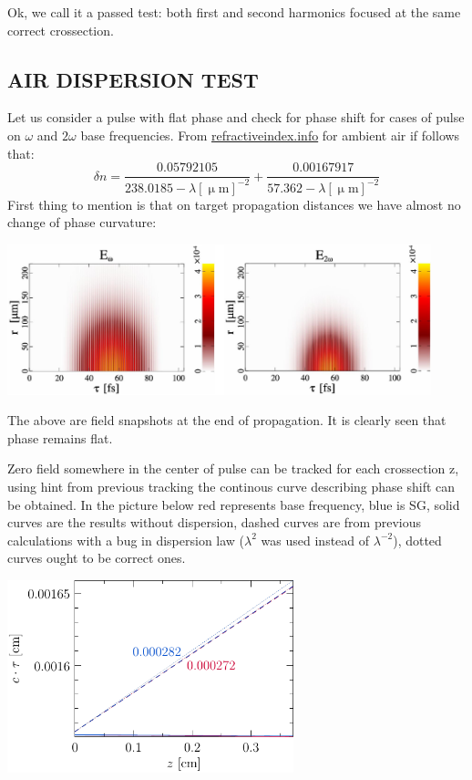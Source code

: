 \documentclass{article}
\newcommand{\ff}{\frac}
\newcommand{\mum}{\upmu\mathrm{m}}
\begin{document}
\noindent
Ok, we call it a passed test: both first and second harmonics focused at the same correct crossection.

\newpage
\subsection{AIR DISPERSION TEST}
Let us consider a pulse with flat phase and check for phase shift for cases of pulse on $\omega$ and $2\omega$ base frequencies. From \url{refractiveindex.info} for ambient air if follows that:
\[ \delta n = \ff{0.05792105}{238.0185-\lambda[\mum]^{-2}} + \ff{0.00167917}{57.362-\lambda[\mum]^{-2}}  \]
First thing to mention is that on target propagation distances we have almost no change of phase curvature:

\centerline{\includegraphics[width=12.3cm]{test/flat_disp_91.pdf}}
The above are field snapshots at the end of propagation. It is clearly seen that phase remains flat.

Zero field somewhere in the center of pulse can be tracked for each crossection z, using hint from previous tracking the continous curve describing phase shift can be obtained. In the picture below red represents base frequency, blue is SG, solid curves are the results without dispersion, dashed curves are from previous calculations with a bug in dispersion law ($\lambda^2$ was used instead of $\lambda^{-2}$), dotted curves ought to be correct ones.

\centerline{\includegraphics[width=8.3cm]{test/air_disp_test.pdf}}
\end{document}
